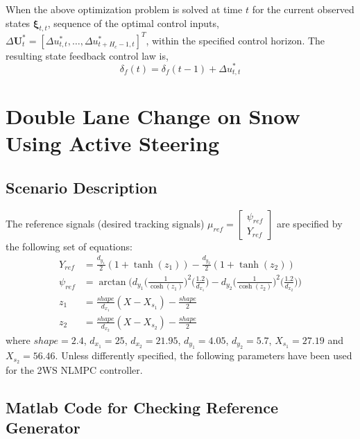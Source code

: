 \documentclass[12pt]{article}
\begin{document}
When the above optimization problem is solved at time $t$ for the current observed states $\bm{\xi}_{t,t}$, sequence of the optimal control inputs, $\Delta\bm{U}^{*}_{t}=[\Delta u^{*}_{t,t},\dots,\Delta u^{*}_{t+H_{c}-1,t}]^{T}$, within the specified control horizon. The resulting state feedback control law is,
\begin{equation}
	\label{eqn:control_law}
	\delta_{f}(t) = \delta_{f}(t-1) + \Delta{u}^{*}_{t,t}
\end{equation} 

\section{Double Lane Change on Snow Using Active Steering}
\subsection{Scenario Description}
The reference signals (desired tracking signals) $\mu_{ref} = \begin{bmatrix} \psi_{ref}\\ Y_{ref} \end{bmatrix}$ are specified by the following set of equations: 
\begin{subequations} 
	\label{eqn:reference_path_angle_equations}
	\begin{align} 
	{Y}_{ref}&= \frac{d_{y_1}}{2}(1 + \tanh(z_1))-\frac{d_{y_2}}{2}(1 + \tanh(z_2)) \\
	{\psi}_{ref} & = \arctan\Bigg(d_{y_1}\Big(\frac{1}{\cosh(z_1)}\Big)^2\Big(\frac{1.2}{d_{x_1}}\Big) - d_{y_2}\Big(\frac{1}{\cosh(z_2)}\Big)^2\Big(\frac{1.2}{d_{x_2}}\Big) \Bigg)  \\
	z_1 &= \frac{shape}{d_{x_1}}(X-X_{s_1})-\frac{shape}{2} \\
	z_2 &= \frac{shape}{d_{x_2}}(X-X_{s_2})-\frac{shape}{2}
	\end{align} 
\end{subequations}
where $shape=2.4$, $d_{x_1} = 25$, $d_{x_2} = 21.95$, $d_{y_1} = 4.05$, $d_{y_2} = 5.7$, $X_{s_1} = 27.19$ and
$X_{s_2} = 56.46$. Unless differently specified, the following parameters have been used for the 2WS NLMPC controller.

\subsection{Matlab Code for Checking Reference Generator}
\end{document}
